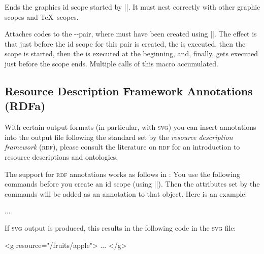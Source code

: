 \begin{command}{\pgfsys@end@idscope}
    Ends the graphics id scope started by |\pgfsys@end@idscope|. It must nest
    correctly with other graphic scopes and \TeX\ scopes.
\end{command}

\begin{command}{\pgfsys@attach@to@id{}}
    Attaches codes to the --pair, where  must have
    been created using |\pgfsys@new@id|. The effect is that just before the id
    scope for this pair is created, the  is executed, then the
    scope is started, then the  is executed at the beginning,
    and, finally,  gets executed just before the scope ends.
    Multiple calls of this macro accumulated.
\end{command}


\subsection{Resource Description Framework Annotations (RDFa)}
\label{section-sys-rdf}

With certain output formats (in particular, with \textsc{svg}) you can insert
annotations into the output file following the standard set by the
\emph{resource description framework} (\textsc{rdf}), please consult the
literature on \textsc{rdf} for an introduction to resource descriptions and
ontologies.

The support for \textsc{rdf} annotations works as follows in \pgfname: You use
the following commands before you create an id scope (using
|\pgfsys@begin@idscope|). Then the attributes set by the commands will be added
as an annotation to that object. Here is an example:
%
\begin{codeexample}
\pgfsys@begin@idscope
  ...
\pgfsys@end@idscope
\end{codeexample}

If \textsc{svg} output is produced, this results in the following code in the
\textsc{svg} file:
%
\begin{codeexample}
<g resource="/fruits/apple">
  ...
</g>
\end{codeexample}


